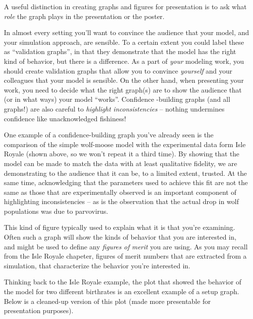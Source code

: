 \documentclass{tufte-handout}
\begin{document}
A useful distinction in creating graphs and figures for presentation is to ask what {\it role} the graph plays in the presentation or the poster. 
 

  In almost every setting you'll want to convince the audience that your model, and your simulation approach, are sensible.  To a certain extent you could label these as ``validation graphs'', in that they demonstrate that the model has the right kind of behavior, but there is a difference.  As a part of {\it your} modeling work, you should create validation graphs that allow you to convince {\it yourself} and your colleagues that your model is sensible.  On the other hand, when presenting your work, you need to decide what the right graph(s) are to show the audience that (or in what ways) your model ``works''.   Confidence -building graphs (and all graphs!) are also careful to {\it highlight inconsistencies} -- nothing undermines confidence like unacknowledged fishiness!

One example of a confidence-building graph you've already seen is the comparison of the simple wolf-moose model with the experimental data form Isle Royale (shown above, so we won't repeat it a third time).  By showing that the model can be made to match the data with at least qualitative fidelity, we are demonstrating to the audience that it can be, to a limited extent, trusted.  At the same time, acknowledging that the parameters used to achieve this fit are not the same as those that are experimentally observed is an important component of highlighting inconsistencies -- as is the observation that the actual drop in wolf populations was due to parvovirus. 

  This kind of figure typically used to explain what it is that you're examining.  Often such a graph will show the kinds of behavior that you are interested in, and might be used to define any {\it figures of merit} you are using.  As you may recall from the Isle Royale chapeter, figures of merit numbers that are extracted from a simulation, that characterize the behavior you're interested in.

Thinking back to the Isle Royale example, the plot that showed the behavior of the model for two different birthrates is an excellent example of a setup graph.  Below is a cleaned-up version of this plot (made more presentable for presentation purposes).
\end{document}
